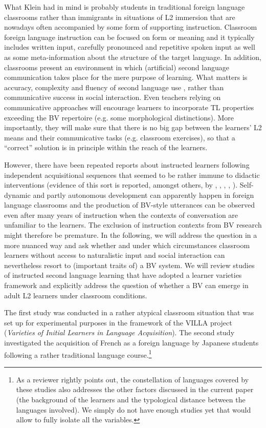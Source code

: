 \documentclass[output=paper]{langscibook}
\begin{document}
What Klein had in mind is probably students in traditional foreign language classrooms rather than immigrants in situations of L2 immersion that are nowadays often accompanied by some form of supporting instruction. Classroom foreign language instruction can be focused on form or meaning and it typically includes written input, carefully pronounced and repetitive spoken input as well as some meta-information about the structure of the target language. In addition, classrooms present an environment in which (artificial) second language communication takes place for the mere purpose of learning. What matters is accuracy, complexity and fluency of second language use \citep{Housen2021}, rather than communicative success in social interaction. Even teachers relying on communicative approaches will encourage learners to incorporate TL properties exceeding the BV repertoire (e.g. some morphological distinctions). More importantly, they will make sure that there is no big gap between the learners’ L2 means and their communicative tasks (e.g. classroom exercises), so that a “correct” solution is in principle within the reach of the learners. 

However, there have been repeated reports about instructed learners following independent acquisitional sequences that seemed to be rather immune to didactic interventions (evidence of this sort is reported, amongst others, by \citealt{DiehlEtAl2000}, \citealt{Schlyter2000}, \citealt{Sun2003}, \citealt{BartningSchlyter2004}, \citealt{Granget2015, Granget2017}). Self-dynamic and partly autonomous development can apparently happen in foreign language classrooms and the production of BV-style utterances can be observed even after many years of instruction when the contexts of conversation are unfamiliar to the learners. The exclusion of instruction contexts from BV research might therefore be premature. In the following, we will address the question in a more nuanced way and ask whether and under which circumstances classroom learners without access to naturalistic input and social interaction can nevertheless resort to (important traits of) a BV system. We will review studies of instructed second language learning that have adopted a learner varieties framework and explicitly address the question of whether a BV can emerge in adult L2 learners under classroom conditions.  

The first study was conducted in a rather atypical classroom situation that was set up for experimental purposes in the framework of the VILLA project (\textit{Varieties of Initial Learners in Language Acquisition}). The second study investigated the acquisition of French as a foreign language by Japanese students following a rather traditional language course.\footnote{As a reviewer rightly points out, the constellation of languages covered by these studies also addresses the other factors discussed in the current paper (the background of the learners and the typological distance between the languages involved). We simply do not have enough studies yet that would allow to fully isolate all the variables.}
\end{document}
